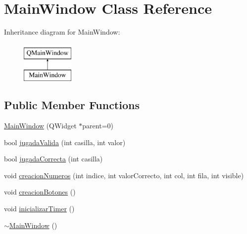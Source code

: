 \hypertarget{class_main_window}{\section{Main\-Window Class Reference}
\label{class_main_window}
}
Inheritance diagram for Main\-Window\-:\begin{figure}[H]
\begin{center}
\leavevmode
\includegraphics[height=2.000000cm]{class_main_window}
\end{center}
\end{figure}
\subsection*{Public Member Functions}
\begin{DoxyCompactItemize}
\item 
\hyperlink{class_main_window_a8b244be8b7b7db1b08de2a2acb9409db}{Main\-Window} (Q\-Widget $\ast$parent=0)
\item 
bool \hyperlink{class_main_window_adb7dbe0ece2eaa1a92b3ee1da8ae3327}{jugada\-Valida} (int casilla, int valor)
\item 
bool \hyperlink{class_main_window_ab68ff992b159d33b1f80606deabe0361}{jugada\-Correcta} (int casilla)
\item 
void \hyperlink{class_main_window_a18e451ac33947c4e8c058a5266daafbd}{creacion\-Numeros} (int indice, int valor\-Correcto, int col, int fila, int visible)
\item 
void \hyperlink{class_main_window_af0799066013e5dac6614367dc715d3e4}{creacion\-Botones} ()
\item 
void \hyperlink{class_main_window_ade1681f57a1c4cacefd88030c3f70b23}{inicializar\-Timer} ()
\item 
\hyperlink{class_main_window_ae98d00a93bc118200eeef9f9bba1dba7}{$\sim$\-Main\-Window} ()
\end{DoxyCompactItemize}


